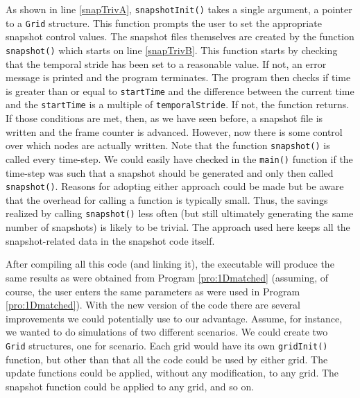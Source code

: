 As shown in line \ref{snapTrivA}, {\tt snapshotInit()} takes a single
argument, a pointer to a {\tt Grid} structure.  This function prompts
the user to set the appropriate snapshot control values.  The snapshot
files themselves are created by the function {\tt snapshot()} which
starts on line \ref{snapTrivB}.  This function starts by checking that
the temporal stride has been set to a reasonable value.  If not, an
error message is printed and the program terminates.  The program then
checks if time is greater than or equal to {\tt startTime} and the
difference between the current time and the {\tt startTime} is a
multiple of {\tt temporalStride}.  If not, the function returns.  If
those conditions are met, then, as we have seen before, a snapshot
file is written and the frame counter is advanced.  However, now there
is some control over which nodes are actually written.  Note that the
function {\tt snapshot()} is called every time-step.  We could easily
have checked in the {\tt main()} function if the time-step was such
that a snapshot should be generated and only then called {\tt
  snapshot()}.  Reasons for adopting either approach could be made but
be aware that the overhead for calling a function is typically small.
Thus, the savings realized by calling {\tt snapshot()} less often (but
still ultimately generating the same number of snapshots) is likely to
be trivial.  The approach used here keeps all the snapshot-related
data in the snapshot code itself.

After compiling all this code (and linking it), the executable will
produce the same results as were obtained from Program
\ref{pro:1Dmatched} (assuming, of course, the user enters the same
parameters as were used in Program \ref{pro:1Dmatched}).  With the new
version of the code there are several improvements we could
potentially use to our advantage.  Assume, for instance, we wanted to
do simulations of two different scenarios.  We could create two {\tt
  Grid} structures, one for scenario.  Each grid would have its own
{\tt gridInit()} function, but other than that all the code could be
used by either grid.  The update functions could be applied, without
any modification, to any grid.  The snapshot function could be applied
to any grid, and so on.


